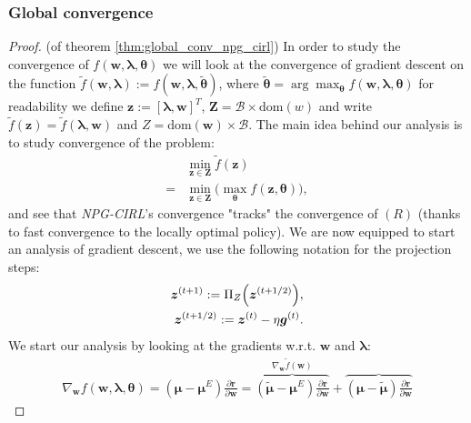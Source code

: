 \subsubsection{Global convergence}
\label{sec:NPG_CIRL_global_convergence}
\begin{proof}
    (of theorem \ref{thm:global_conv_npg_cirl}) In order to study the convergence of $f(\bm{w},\bm{\lambda},\bm{\theta})$  we will look at the convergence of gradient descent on the function  $\tilde{f}(\bm{w},\bm{\lambda}) := f(\bm{w},\bm{\lambda},\tilde{\bm{\theta}})$, where $\tilde{\bm{\theta}} = \arg \max_{\bm{\theta}} f(\bm{w},\bm{\lambda},\bm{\theta})$ for readability we define $\bm{z} := [\bm{\lambda},\bm{w}]^T$, $\bm{Z}=\mathcal{B}\times \text{dom}(w)$ and write $\tilde{f}(\bm{z}) = \tilde{f}(\bm{\lambda},\bm{w})$ and $Z=\text{dom}(\bm{w})\times\mathcal{B}$. The main idea behind our analysis is to study convergence of the problem:
\begin{align*}
    &\min_{\bm{z}\in\bm{Z}} \tilde{f}(\bm{z}) \tag{R}\\
    =&\min_{\bm{z}\in\bm{Z}} \Big(  \max_{\bm{\theta}} {f}(\bm{z},\bm{\theta}) \Big),
\end{align*}
and see that \textit{NPG-CIRL}'s convergence "tracks" the convergence of $(R)$ (thanks to fast convergence to the locally optimal policy). We are now equipped to start an analysis of gradient descent, we use the following notation for the projection steps:
\begin{align*}
    \bm{z}^{(t+1)} := \Pi_Z \Bigl( \bm{z}^{(t+1/2)}  \Bigr),\\
    \bm{z}^{(t+1/2)} := \bm{z}^{(t)} - \eta \bm{g}^{(t)}.
\end{align*}
\noindent
We start our analysis by looking at the gradients w.r.t. $\bm{w}$ and $\bm{\lambda}$:
\begin{align}
    \label{eq:rew_grad}
    \nabla_{\bm{w}} f(\bm{w},\bm{\lambda},{\bm{\theta}}) =
    (\bm{\mu}-\bm{\mu}^E) \frac{\partial \bm{r}}{\partial \bm{w}}
    =  \overbrace{
        (\tilde{\bm{\mu}}-\bm{\mu}^E) \frac{\partial \bm{r}}{\partial \bm{w}}
    }^{ 
        \nabla_{\bm{w}} \tilde{f}(\bm{w})
    }
    +\overbrace{(\bm{\mu}-\tilde{\bm{\mu}}) \frac{\partial \bm{r}}{\partial \bm{w}} }^{
}
\end{align}
\end{proof}
